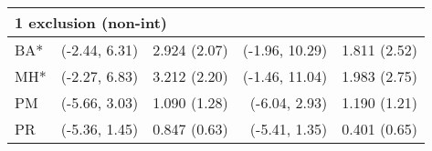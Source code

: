 \begin{table}[t]
\begin{tabular}{lrrrr}
\midrule
\multicolumn{5}{l}{1 exclusion (non-int)} \\ 
\midrule
\hspace{11.25pt} BA* & (-2.44, 6.31) & 2.924 (2.07) & (-1.96, 10.29) & 1.811 (2.52) \\ 
\hspace{11.25pt} MH* & (-2.27, 6.83) & 3.212 (2.20) & (-1.46, 11.04) & 1.983 (2.75) \\ 
\hspace{11.25pt} PM & (-5.66, 3.03) & 1.090 (1.28) & (-6.04, 2.93) & 1.190 (1.21) \\ 
\hspace{11.25pt} PR & (-5.36, 1.45) & 0.847 (0.63) & (-5.41, 1.35) & 0.401 (0.65) \\ 
\bottomrule
\end{tabular}
\end{table}

